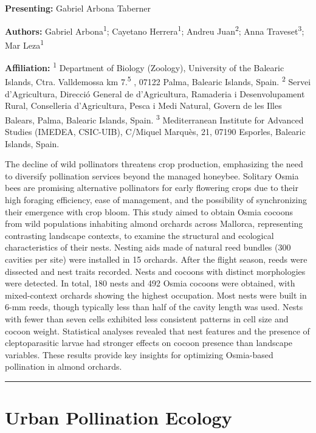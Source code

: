 \documentclass[
  letterpaper,
  DIV=11,
  numbers=noendperiod]{scrartcl}
\begin{document}
\textbf{Presenting:} Gabriel Arbona Taberner

\textbf{Authors:} Gabriel Arbona\textsuperscript{1}; Cayetano
Herrera\textsuperscript{1}; Andreu Juan\textsuperscript{2}; Anna
Traveset\textsuperscript{3}; Mar Leza\textsuperscript{1}

\textbf{Affiliation:} \textsuperscript{1} Department of Biology
(Zoology), University of the Balearic Islands, Ctra. Valldemossa km
7.\textsuperscript{5} , 07122 Palma, Balearic Islands, Spain.
\textsuperscript{2} Servei d'Agricultura, Direcció General de
d'Agricultura, Ramaderia i Desenvolupament Rural, Conselleria
d'Agricultura, Pesca i Medi Natural, Govern de les Illes Balears, Palma,
Balearic Islands, Spain. \textsuperscript{3} Mediterranean Institute for
Advanced Studies (IMEDEA, CSIC-UIB), C/Miquel Marquès, 21, 07190
Esporles, Balearic Islands, Spain.

The decline of wild pollinators threatens crop production, emphasizing
the need to diversify pollination services beyond the managed honeybee.
Solitary Osmia bees are promising alternative pollinators for early
flowering crops due to their high foraging efficiency, ease of
management, and the possibility of synchronizing their emergence with
crop bloom. This study aimed to obtain Osmia cocoons from wild
populations inhabiting almond orchards across Mallorca, representing
contrasting landscape contexts, to examine the structural and ecological
characteristics of their nests. Nesting aids made of natural reed
bundles (300 cavities per site) were installed in 15 orchards. After the
flight season, reeds were dissected and nest traits recorded. Nests and
cocoons with distinct morphologies were detected. In total, 180 nests
and 492 Osmia cocoons were obtained, with mixed-context orchards showing
the highest occupation. Most nests were built in 6-mm reeds, though
typically less than half of the cavity length was used. Nests with fewer
than seven cells exhibited less consistent patterns in cell size and
cocoon weight. Statistical analyses revealed that nest features and the
presence of cleptoparasitic larvae had stronger effects on cocoon
presence than landscape variables. These results provide key insights
for optimizing Osmia-based pollination in almond orchards.

\begin{center}\rule{0.5\linewidth}{0.5pt}\end{center}

\section{Urban Pollination Ecology}\label{urban-pollination-ecology}
\end{document}
